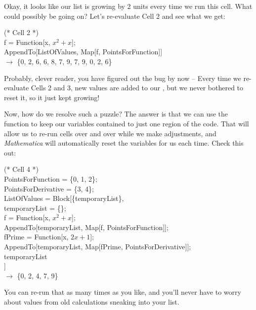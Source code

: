Okay, it looks like our list is growing by 2 units every time we run this cell. What could possibly be going on? Let's re-evaluate Cell 2 and see what we get:

\begin{code}
	   (* Cell 2 *)\\
	   f = Function[x, $x^2 + x$];\\
	   AppendTo[ListOfValues, Map[f, PointsForFunction]]\\
	   $\rightarrow$ \{0, 2, 6, 6, 8, 7, 9, 7, 9, 0, 2, 6\}\\
\end{code}

Probably, clever reader, you have figured out the bug by now -- Every time we re-evaluate Cells 2 and 3, new values are added to our , but we never bothered to reset it, so it just kept growing! 

Now, how do we resolve such a puzzle? The answer is that we can use the  function to keep our variables contained to just one region of the code. That will allow us to re-run cells over and over while we make adjustments, and \emph{Mathematica} will automatically reset the variables for us each time. Check this out:

\begin{code}
	   (* Cell 4 *)\\
	   PointsForFunction = \{0, 1, 2\};\\
	   PointsForDerivative = \{3, 4\};\\
	   ListOfValues = Block[\{temporaryList\},\\
		temporaryList = \{\};\\
		f = Function[x, $x^2 + x$];\\
		AppendTo[temporaryList, Map[f, PointsForFunction]];\\
	   	fPrime = Function[x, $2x + 1$];\\
	   	AppendTo[temporaryList, Map[fPrime, PointsForDerivative]];\\
	   	temporaryList\\
	   ]\\
	   $\rightarrow$ \{0, 2, 4, 7, 9\}
\end{code}

You can re-run that as many times as you like, and you'll never have to worry about values from old calculations sneaking into your list.
